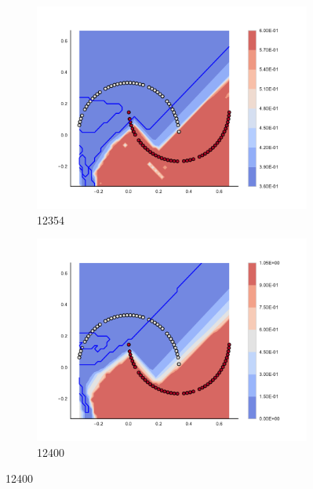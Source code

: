 \begin{figure}[h]
\begin{subfigure}[b]{0.09\textwidth}
    \includegraphics[clip, trim=2.35cm 1.75cm 4.5cm 0cm,width=\textwidth]{img/convergence/12354.pdf}
    \caption{12354}
    \label{fig:convergence_12354}
\end{subfigure}
%
\begin{subfigure}[b]{0.09\textwidth}
    \includegraphics[clip, trim=2.35cm 1.75cm 4.5cm 0cm,width=\textwidth]{img/convergence/12400.pdf}
    \caption{12400}
    \label{fig:convergence_12400}
\end{subfigure}
%
        \end{figure}

